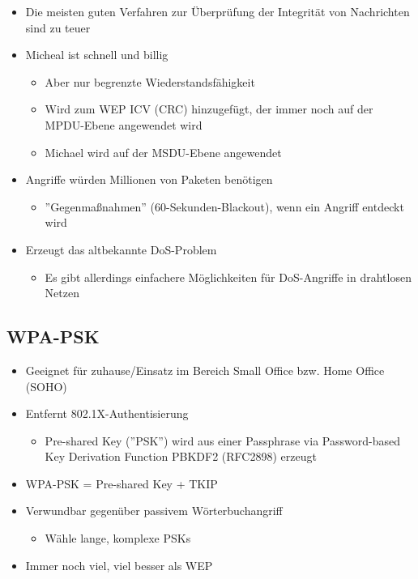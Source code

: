\documentclass[openany]{book}
\begin{document}
\begin{itemize}
    \item Die meisten guten Verfahren zur Überprüfung der Integrität von Nachrichten sind zu teuer
    \item Micheal ist schnell und billig
    \begin{itemize}
        \item Aber nur begrenzte Wiederstandsfähigkeit
        \item Wird zum WEP ICV (CRC) hinzugefügt, der immer noch auf der MPDU-Ebene angewendet wird
        \item Michael wird auf der MSDU-Ebene angewendet
    \end{itemize}
    \item Angriffe würden Millionen von Paketen benötigen
    \begin{itemize}
        \item ''Gegenmaßnahmen'' (60-Sekunden-Blackout), wenn ein Angriff entdeckt wird
    \end{itemize}
    \item Erzeugt das altbekannte DoS-Problem
    \begin{itemize}
        \item Es gibt allerdings einfachere Möglichkeiten für DoS-Angriffe in drahtlosen Netzen
    \end{itemize}
\end{itemize}

\subsection{WPA-PSK}

\begin{itemize}
    \item Geeignet für zuhause/Einsatz im Bereich Small Office bzw. Home Office (SOHO)
    \item Entfernt 802.1X-Authentisierung
    \begin{itemize}
        \item Pre-shared Key (''PSK'') wird aus einer Passphrase via Password-based Key Derivation Function PBKDF2 (RFC2898) erzeugt
    \end{itemize}
    \item WPA-PSK = Pre-shared Key + TKIP
    \item Verwundbar gegenüber passivem Wörterbuchangriff
    \begin{itemize}
        \item Wähle lange, komplexe PSKs
    \end{itemize}
    \item Immer noch viel, viel besser als WEP
\end{itemize}
\end{document}
